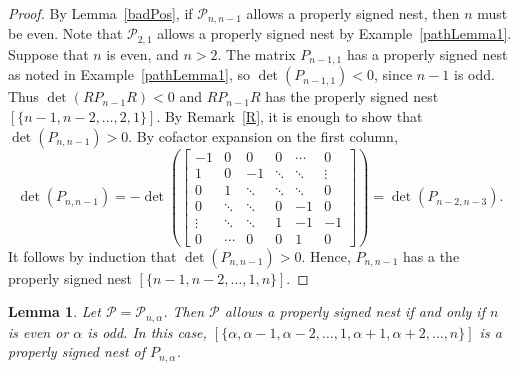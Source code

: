 \documentclass[10pt]{amsart}
\newtheorem{lemma}[proposition]{Lemma}
\begin{document}
\begin{proof}
By Lemma~\ref{badPos}, if ${\mathcal{P}}_{n, n-1}$ allows a properly signed nest, then $n$ must be even. Note that ${\mathcal{P}}_{2, 1}$ allows a properly signed nest by Example~\ref{pathLemma1}. Suppose that $n$ is even, and $n > 2$. 
The matrix $P_{n-1, 1}$ has a properly signed nest as noted in Example~\ref{pathLemma1}, 
so $\det(P_{n-1, 1}) < 0$, since $n-1$ is odd. Thus $\det(RP_{n-1}R)<0$ 
and $RP_{n-1}R$ has the properly 
signed nest $[\{n-1,n-2,\ldots,2,1\}]$.  By Remark~\ref{R}, 
it is enough to show that $\det(P_{n, n-1}) > 0$. By cofactor expansion on the first column, 
$$\det(P_{n, n-1}) = -\det\left(\left[ \begin{array}{c|ccccc}
-1 		& 0			& 0		&0		& \cdots 	& 0\\ \hline
1 		& 0			& -1		& \ddots	& \ddots  	& \vdots\\
0	 	& 1			& \ddots	& \ddots	& \ddots		& 0\\
0	 	& \ddots		& \ddots	& 0		& -1			& 0\\
\vdots	& \ddots		& \ddots	& 1		& -1 		& -1 \\
0	  	& \cdots		& 0		& 0		& 1  		& 0 \end{array} \right]\right) = \det(P_{n-2, n-3}).$$
It follows by induction that $\det(P_{n, n-1}) > 0$. Hence, $P_{n, n-1}$ has a the 
properly signed nest $[\{n-1,n-2,\ldots,1,n\}].$  
\end{proof}

\begin{lemma}\label{pathLemma3}
Let ${\mathcal{P}} = {\mathcal{P}}_{n, \alpha}$. Then ${\mathcal{P}}$ allows a properly signed nest  if and only if $n$ is even or $\alpha$ is odd.
In this case, $\left[\{\alpha, \alpha-1, \alpha-2,\ldots,1, \alpha+1, \alpha+2,\ldots,n\}\right]$ is a properly signed nest of $P_{n,\alpha}$.
\end{lemma}
\end{document}
